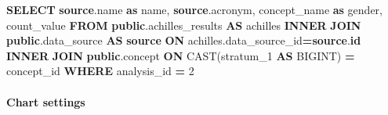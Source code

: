 \documentclass[
]{book}
\newenvironment{Shaded}{\begin{snugshade}}{\end{snugshade}}
\newcommand{\DecValTok}[1]{\textcolor[rgb]{0.00,0.00,0.81}{#1}}
\newcommand{\FunctionTok}[1]{\textcolor[rgb]{0.00,0.00,0.00}{#1}}
\newcommand{\KeywordTok}[1]{\textcolor[rgb]{0.13,0.29,0.53}{\textbf{#1}}}
\newcommand{\NormalTok}[1]{#1}
\newcommand{\OperatorTok}[1]{\textcolor[rgb]{0.81,0.36,0.00}{\textbf{#1}}}
\begin{document}
\begin{Shaded}
\begin{Highlighting}[]
\KeywordTok{SELECT} \KeywordTok{source}\NormalTok{.name }\KeywordTok{as}\NormalTok{ name,}
       \KeywordTok{source}\NormalTok{.acronym,}
\NormalTok{       concept\_name }\KeywordTok{as}\NormalTok{ gender,}
\NormalTok{       count\_value}
\KeywordTok{FROM} \KeywordTok{public}\NormalTok{.achilles\_results }\KeywordTok{AS}\NormalTok{ achilles}
\KeywordTok{INNER} \KeywordTok{JOIN} \KeywordTok{public}\NormalTok{.data\_source }\KeywordTok{AS} \KeywordTok{source} \KeywordTok{ON}\NormalTok{ achilles.data\_source\_id}\OperatorTok{=}\KeywordTok{source}\NormalTok{.}\KeywordTok{id}
\KeywordTok{INNER} \KeywordTok{JOIN} \KeywordTok{public}\NormalTok{.concept }\KeywordTok{ON} \FunctionTok{CAST}\NormalTok{(stratum\_1 }\KeywordTok{AS}\NormalTok{ BIGINT) }\OperatorTok{=}\NormalTok{ concept\_id}
\KeywordTok{WHERE}\NormalTok{ analysis\_id }\OperatorTok{=} \DecValTok{2}
\end{Highlighting}
\end{Shaded}

\hypertarget{chart-settings-2}{%
\paragraph*{Chart settings}\label{chart-settings-2}}
\end{document}
